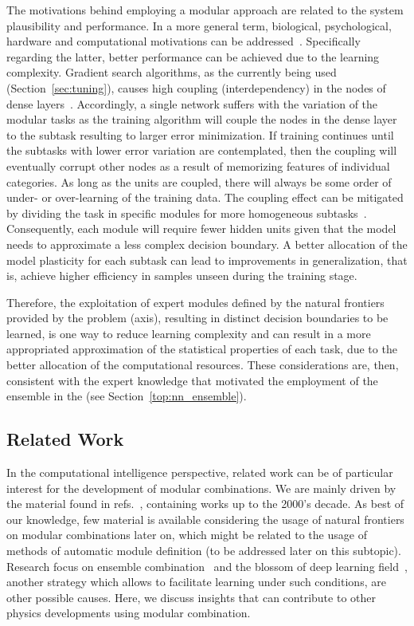 The motivations behind employing a modular approach are related to the system
plausibility and performance. In a more general term, biological,
psychological, hardware and computational motivations can be
addressed~\cite{Auda1999}. Specifically regarding the latter, better
performance can be achieved due to the learning complexity. Gradient search
algorithms, as the currently being used (Section~\ref{sec:tuning}), causes high
coupling (interdependency) in the nodes of dense
layers~\cite{Auda1999,Auda1994,Joe1990}. Accordingly, a single network suffers
with the variation of the modular tasks as the training algorithm will couple
the nodes in the dense layer to the subtask resulting to larger error
minimization.  If training continues until the subtasks with lower error
variation are contemplated, then the coupling will eventually corrupt other
nodes as a result of memorizing features of individual categories. As long as
the units are coupled, there will always be some order of under- or
over-learning of the training data. The coupling effect can be mitigated by
dividing the task in specific modules for more homogeneous
subtasks~\cite{Auda1999}. Consequently, each module will require fewer hidden
units given that the model needs to approximate a less complex decision
boundary. A better allocation of the model plasticity for each subtask can lead
to improvements in generalization, that is, achieve higher efficiency in samples
unseen during the training stage.

Therefore, the exploitation of expert modules defined by the natural frontiers
provided by the problem (\eteta axis), resulting in distinct decision
boundaries to be learned, is one way to reduce learning complexity and
can result in a more appropriated approximation of the statistical properties of
each task, due to the better allocation of the computational resources. These
considerations are, then, consistent with the expert knowledge that motivated
the employment of the ensemble in the \rnn (see Section~\ref{top:nn_ensemble}).

\subsection{Related Work}\label{ssec:ml_related}

In the computational intelligence perspective, related work can be of particular
interest for the development of modular combinations. We are mainly driven by
the material found in refs.~\cite{Auda1999,SharkeyCombNN}, containing works up
to the 2000's decade. As best of our knowledge, few material is available
considering the usage of natural frontiers on modular combinations later on,
which might be related to the usage of methods of automatic module definition
(to be addressed later on this subtopic). Research focus on ensemble
combination~\cite{zhou_ensemble} and the blossom of deep learning
field~\cite{Goodfellow2016}, another strategy which allows to facilitate
learning under such conditions, are other possible causes. Here, we discuss
insights that can contribute to other physics developments using modular
combination.

